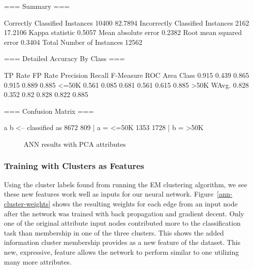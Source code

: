 \documentclass{sig-alternate}
\begin{document}
\tiny
\begin{verbbox}
=== Summary ===

Correctly Classified Instances       10400               82.7894 %
Incorrectly Classified Instances      2162               17.2106 %
Kappa statistic                          0.5057
Mean absolute error                      0.2382
Root mean squared error                  0.3404
Total Number of Instances            12562     

=== Detailed Accuracy By Class ===

       TP Rate   FP Rate   Precision   Recall  F-Measure   ROC Area  Class
         0.915     0.439      0.865     0.915     0.889      0.885     <=50K
         0.561     0.085      0.681     0.561     0.615      0.885     >50K
WAvg.    0.828     0.352      0.82      0.828     0.822      0.885

=== Confusion Matrix ===

    a    b   <-- classified as
 8672  809 |    a =  <=50K
 1353 1728 |    b =  >50K
\end{verbbox}
\normalsize

\begin{figure}[!htbp]
    \centering
    \theverbbox
    \caption{ANN results with PCA attributes\label{ann-summary-pca}}
\end{figure}



\subsubsection{Training with Clusters as Features}

Using the cluster labels found from running the EM clustering algorithm, we see these new features work well as inputs for our neural network. Figure~\ref{ann-cluster-weights} shows the resulting weights for each edge from an input node after the network was trained with back propagation and gradient decent. Only one of the original attribute input nodes contributed more to the classification task than membership in one of the three clusters. This shows the added information cluster membership provides as a new feature of the dataset. This new, expressive, feature allows the network to perform similar to one utilizing many more attributes.
\end{document}
